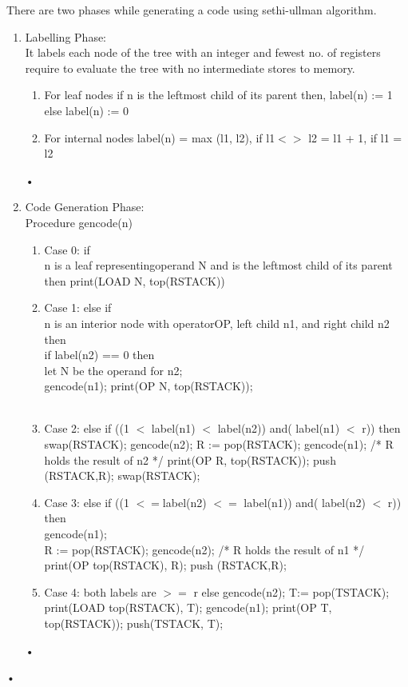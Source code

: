 \documentclass[11pt]{article}
\begin{document}
	\noindent
	There are two phases while generating a code using sethi-ullman algorithm.\\
	\begin{enumerate}
		\item Labelling Phase:\\
		It labels each node of the tree with an integer and fewest no. of registers require to evaluate the tree with no intermediate stores to memory.\\
		\begin{enumerate}
			\item For leaf nodes if n is the leftmost child of its parent then, label(n) := 1 else label(n) := 0
			\item For internal nodes label(n) = max (l1, l2), if l1$<>$ l2
			= l1 + 1, if l1 = l2
		\end{enumerate}•
		
		\item Code Generation Phase:\\
		Procedure gencode(n)\\
		\begin{enumerate}
			\item Case 0: if\\
			n is a leaf representingoperand N and is the leftmost child of its parent then print(LOAD N, top(RSTACK))\\
			\item Case 1: else if\\
			n is an interior node with operatorOP, left child n1, and right child n2 then\\
			if label(n2) == 0 then\\
			{
				let N be the operand for n2;\\
				gencode(n1); print(OP N, top(RSTACK));\\
			}\\
			\item Case 2: else if ((1 $<$ label(n1) $<$ label(n2)) and( label(n1) $<$ r)) then {\\
				swap(RSTACK); gencode(n2); R := pop(RSTACK); gencode(n1); /* R holds the result of n2 */ print(OP R, top(RSTACK)); push (RSTACK,R); swap(RSTACK);\\
			}
			\item Case 3: else if ((1 $<= $label(n2) $<=$ label(n1)) and( label(n2) $<$ r)) then {\\
				gencode(n1);\\
				R := pop(RSTACK); gencode(n2); /* R holds the result of n1 */ print(OP top(RSTACK), R); push (RSTACK,R);\\
			}
			\item Case 4: both labels are $>=$ r else { gencode(n2); T:= pop(TSTACK); print(LOAD top(RSTACK), T); gencode(n1); print(OP T, top(RSTACK)); push(TSTACK, T);\\
			}
			
		\end{enumerate}•
	\end{enumerate}•
	
\end{document}
